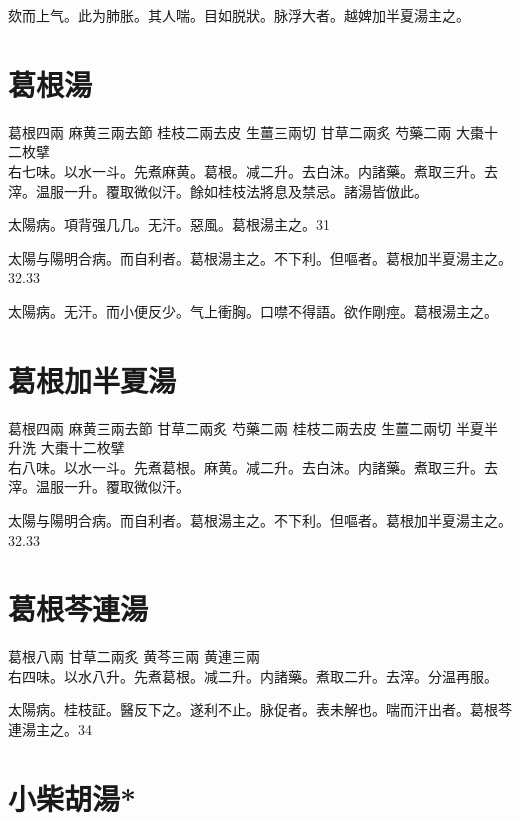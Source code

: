 欬而上气。此为肺胀。其人喘。目如脱狀。脉浮大者。越婢加半夏湯主之。

\section{葛根湯}

葛根{\scriptsize 四兩} 麻黄{\scriptsize 三兩去節} 桂枝{\scriptsize 二兩去皮} 生薑{\scriptsize 三兩切} 甘草{\scriptsize 二兩炙} 芍藥{\scriptsize 二兩} 大棗{\scriptsize 十二枚擘}\\
右七味。以水一斗。先煮麻黄。葛根。减二升。去白沫。内諸藥。煮取三升。去滓。温服一升。覆取微似汗。餘如桂枝法將息及禁忌。諸湯皆倣此。

太陽病。項背强几几。无汗。惡風。葛根湯主之。31

太陽与陽明合病。而自利{\khaaitp 者}。葛根湯主之。不下利。但嘔者。葛根加半夏湯主之。32.33

太陽病。无汗。而小便反少。气上衝胸。口噤不得語。欲作剛痙。葛根湯主之。

\section{葛根加半夏湯}

葛根{\scriptsize 四兩} 麻黄{\scriptsize 三兩去節} 甘草{\scriptsize 二兩炙} 芍藥{\scriptsize 二兩} 桂枝{\scriptsize 二兩去皮} 生薑{\scriptsize 二兩切} 半夏{\scriptsize 半升洗} 大棗{\scriptsize 十二枚擘}\\
右八味。以水一斗。先煮葛根。麻黄。减二升。去白沫。内諸藥。煮取三升。去滓。温服一升。覆取微似汗。

太陽与陽明合病。而自利{\khaaitp 者}。葛根湯主之。不下利。但嘔者。葛根加半夏湯主之。32.33

\section{葛根芩連湯}

葛根{\scriptsize 八兩} 甘草{\scriptsize 二兩炙} 黄芩{\scriptsize 三兩} 黄連{\scriptsize 三兩}\\
右四味。以水八升。先煮葛根。减二升。内諸藥。煮取二升。去滓。分温再服。

太陽病。桂枝証。醫反下之。遂利不止。脉促者。表未解也。喘而汗出者。葛根芩連湯主之。34

\section{小柴胡湯*}

